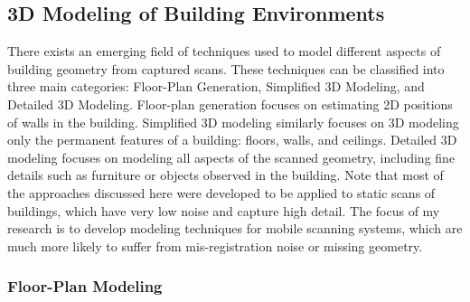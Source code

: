 \documentclass[journal]{IEEEtran}
\begin{document}
\subsection{3D Modeling of Building Environments}
\label{ssec:building_meshing}

There exists an emerging field of techniques used to model different aspects of building geometry from captured scans.  These techniques can be classified into three main categories:  Floor-Plan Generation, Simplified 3D Modeling, and Detailed 3D Modeling.  Floor-plan generation focuses on estimating 2D positions of walls in the building.  Simplified 3D modeling similarly focuses on 3D modeling only the permanent features of a building: floors, walls, and ceilings.  Detailed 3D modeling focuses on modeling all aspects of the scanned geometry, including fine details such as furniture or objects observed in the building.  Note that most of the approaches discussed here were developed to be applied to static scans of buildings, which have very low noise and capture high detail. The focus of my research is to develop modeling techniques for mobile scanning systems, which are much more likely to suffer from mis-registration noise or missing geometry.

\subsubsection{Floor-Plan Modeling}
\label{sssec:background_floorplan}
\end{document}
